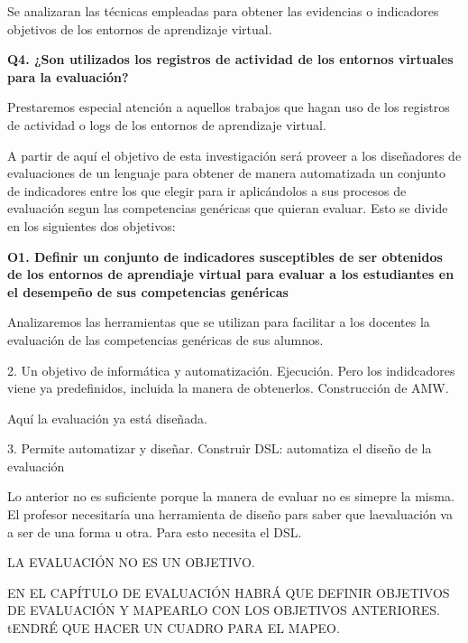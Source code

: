 


Se analizaran las técnicas empleadas para obtener las evidencias o indicadores objetivos de los entornos de aprendizaje virtual.

\bigskip
\textbf{Q4. ¿Son utilizados los registros de actividad de los entornos virtuales para la evaluación?}
\bigskip


Prestaremos especial atención a aquellos trabajos que hagan uso de los registros de actividad o logs de los entornos de aprendizaje virtual.

\bigskip
A partir de aquí el objetivo de esta investigación será proveer a los diseñadores de evaluaciones de un lenguaje para obtener de manera automatizada un conjunto de indicadores entre los que elegir para ir aplicándolos a sus procesos de evaluación segun las competencias genéricas que quieran evaluar. Esto se divide en los siguientes dos objetivos:
 
\bigskip
\textbf{O1. Definir un conjunto de indicadores susceptibles de ser obtenidos de los entornos de aprendiaje virtual para evaluar a los estudiantes en el desempeño de sus competencias genéricas}
\bigskip

Analizaremos las herramientas que se utilizan para facilitar a los docentes la evaluación de las competencias genéricas de sus alumnos.

2. Un objetivo de informática y automatización.  Ejecución. Pero los indidcadores viene ya predefinidos, incluida la manera de obtenerlos. Construcción de AMW.

Aquí la evaluación ya está diseñada.

3. Permite automatizar y diseñar. Construir DSL: automatiza el diseño de la evaluación

Lo anterior no es suficiente porque la manera de evaluar no es simepre la misma. El profesor necesitaría una herramienta de diseño pars saber que laevaluación va a ser de una forma u otra. Para esto necesita el DSL.

LA EVALUACIÓN NO ES UN OBJETIVO.

EN EL CAPÍTULO DE EVALUACIÓN HABRÁ QUE DEFINIR OBJETIVOS DE EVALUACIÓN Y MAPEARLO CON LOS OBJETIVOS ANTERIORES. tENDRÉ QUE HACER UN CUADRO PARA EL MAPEO.

